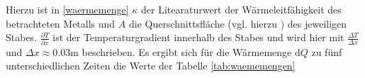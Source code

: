 Hierzu ist in \eqref{waermemenge} $\kappa$ der Litearaturwert der Wärmeleitfähigkeit des betrachteten Metalls und $A$ die Querschnittsfläche (vgl. hierzu \cite{V204}) des jeweiligen Stabes.
$\frac{\partial T}{\partial x}$ ist der Temperaturgradient innerhalb des Stabes und wird hier mit $\frac{\Delta T}{\Delta x}$ und $\Delta x \approx 0.03\si{\meter}$ beschrieben.
Es ergibt sich für die Wärmemenge $\mathup{d}Q$ zu fünf unterschiedlichen Zeiten die Werte der Tabelle \ref{tab:waememengen}
